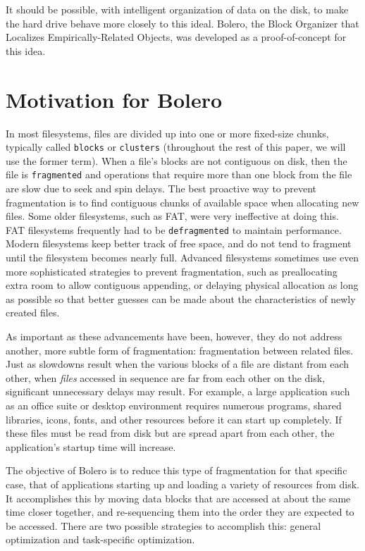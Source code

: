 \documentclass[10pt,twocolumn,letterpaper]{article}
\begin{document}
It should be possible, with intelligent organization of data on the disk, to make the hard drive behave
more closely to this ideal. Bolero, the Block Organizer that Localizes Empirically-Related Objects, was developed as a proof-of-concept for this idea.

\section{Motivation for Bolero}\label{sec:motive}

In most filesystems, files are divided up
into one or more fixed-size chunks, typically called \texttt{blocks} or \texttt{clusters} (throughout the rest of this paper, we will use the former term). When a file's blocks
are not contiguous on disk, then the file is \texttt{fragmented}
and operations that require more than one block from the file are slow due to
seek and spin delays. The best proactive way to prevent fragmentation is to find contiguous
chunks of available space when allocating new files. Some older filesystems, such as FAT, were
very ineffective at doing this\cite{fathistory}.
FAT filesystems frequently had to be \texttt{defragmented} to maintain performance.
Modern filesystems keep better track of free space,
and do not tend to fragment until the filesystem becomes nearly full. Advanced filesystems sometimes
use even more sophisticated strategies to prevent fragmentation, such as preallocating extra room to allow 
contiguous appending, or delaying physical allocation as long as possible so that better guesses
can be made about the characteristics of newly created files\cite{xfs}.

As important as these advancements have been, however, they do not address another, more subtle form of fragmentation: fragmentation between related files.
Just as slowdowns result when the various blocks of a file are distant from each other, when \emph{files} accessed in sequence are far from each other on the disk, significant unnecessary delays may result. For example, a large application such as an office suite or desktop environment requires numerous programs, shared libraries, icons, fonts, and other resources before it can start up completely. If these files must be read from disk but are spread apart from each other, the application's startup time will increase.

The objective of Bolero is to reduce this type of fragmentation for that specific case, that of applications
starting up and loading a variety of resources from disk. It accomplishes this by moving data blocks that are accessed at about the same time closer together, and re-sequencing them into the order they are expected to be accessed. There are two possible strategies to accomplish this: general optimization and task-specific optimization.
\end{document}
